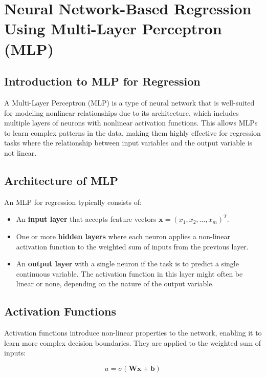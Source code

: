 \documentclass[12pt]{article}
\begin{document}
\section{Neural Network-Based Regression Using Multi-Layer Perceptron (MLP)}

\subsection{Introduction to MLP for Regression}
A Multi-Layer Perceptron (MLP) is a type of neural network that is well-suited for modeling nonlinear relationships due to its architecture, which includes multiple layers of neurons with nonlinear activation functions. This allows MLPs to learn complex patterns in the data, making them highly effective for regression tasks where the relationship between input variables and the output variable is not linear.

\subsection{Architecture of MLP}
An MLP for regression typically consists of:
\begin{itemize}
    \item An \textbf{input layer} that accepts feature vectors $\mathbf{x} = (x_1, x_2, \dots, x_m)^T$.
    \item One or more \textbf{hidden layers} where each neuron applies a non-linear activation function to the weighted sum of inputs from the previous layer.
    \item An \textbf{output layer} with a single neuron if the task is to predict a single continuous variable. The activation function in this layer might often be linear or none, depending on the nature of the output variable.
\end{itemize}

\subsection{Activation Functions}
Activation functions introduce non-linear properties to the network, enabling it to learn more complex decision boundaries. They are applied to the weighted sum of inputs:

\begin{equation}
a = \sigma(\mathbf{W}\mathbf{x} + \mathbf{b})
\end{equation}
\end{document}
